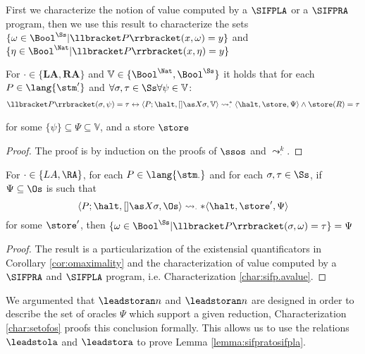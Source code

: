 First we characterize the notion of value computed by a $\SIFPLA$ or a $\SIFPRA$
program, then we use this result to characterize the sets $\{\omega \in \Bool^\Ss| \llbracket P\rrbracket (x, \omega)= y\}$ and $\{\eta \in \Bool^\Nat| \llbracket P \rrbracket(x, \eta)= y\}$

\begin{characterization}
  \label{char:sifp.avalue}
  For $\cdot\in \{\mathbf{LA}, \mathbf{RA}\}$ and
  $\mathbb V \in \{ \Bool^\Nat, \Bool^\Ss\}$
  it holds that for each $P \in \lang{\stm_\cdot'}$ and
  $\forall \sigma, \tau \in \Ss \forall \psi \in \mathbb V$:
  \begin{align*}
    \llbracket P\rrbracket (\sigma, \psi) = \tau \leftrightarrow
    \langle P; \halt, []\as X \sigma, \mathbb V \rangle \leadsto_\cdot^*
    \langle \halt, \store, \Psi \rangle \land \store(R)=\tau
  \end{align*}

 for some
  $\{\psi\}\subseteq \Psi \subseteq \mathbb V$, and a store $\store$
\end{characterization}


\begin{proof}
The proof is by induction on the proofs of $\ssos$ and $\leadsto_\cdot^k$.
\end{proof}


\begin{characterization}
  \label{char:setofos}
  For $\cdot \in \{LA, \RA\}$, for each $P \in \lang{\stm_\cdot}$
  and for each $\sigma, \tau \in \Ss$,
  if $\Psi\subseteq \Os$ is such that
  $$
  \langle P; \halt, []\as X \sigma, \Os \rangle \leadsto_\cdot *\langle \halt, \store', \Psi\rangle
  $$
  for some $\store'$, then
  $\{\omega \in \Bool^\Ss| \llbracket P\rrbracket (\sigma, \omega)= \tau\}=\Psi$
\end{characterization}
\begin{proof}
  The result is a particularization of the existensial quantificators in
  Corollary \ref{cor:omaximality} and the characterization of value computed by
  a $\SIFPRA$ and $\SIFPLA$ program, i.e. Characterization \ref{char:sifp.avalue}.
\end{proof}
%
We argumented that $\leadstoran n$ and $\leadstoran n$ are designed in order
to describe the set of oracles $\Psi$ which support a given reduction,
Characterization \ref{char:setofos} proofs this conclusion formally.
%
This allows us to use the relations $\leadstola$ and $\leadstora$ to prove
Lemma \ref{lemma:sifpratosifpla}.


